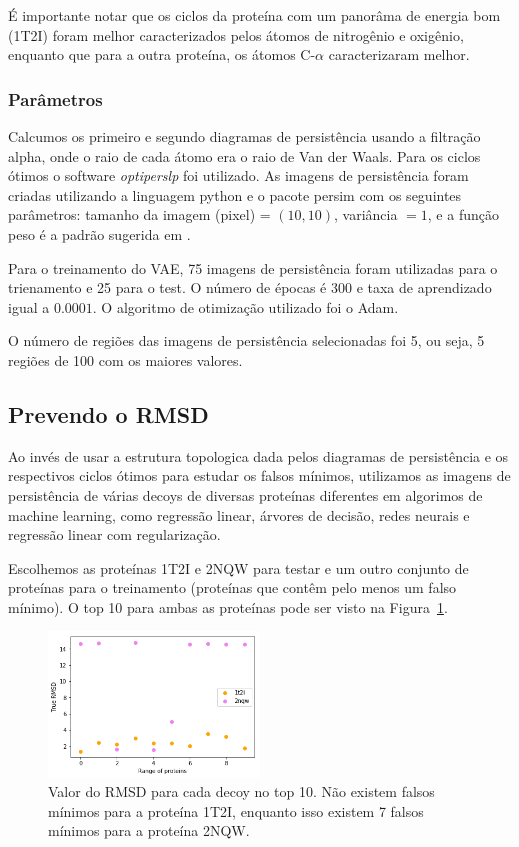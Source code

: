 É importante notar que os ciclos da proteína com um panorâma de energia bom (1T2I) foram melhor caracterizados
pelos átomos de nitrogênio e oxigênio, enquanto que para a outra proteína, os átomos C-$\alpha$ caracterizaram melhor.

\subsubsection{Parâmetros}

Calcumos os primeiro e segundo diagramas de persistência usando a filtração alpha, onde o raio de cada átomo
era o raio de Van der Waals. Para os ciclos ótimos o software \textit{optiperslp} foi utilizado. As imagens
de persistência foram criadas utilizando a linguagem python e o pacote persim \cite{scikittda2019} com
os seguintes parâmetros: tamanho da imagem (pixel) = $(10,10)$, variância $=1$, e a função peso é a padrão
sugerida em \cite{Adams2017}.

Para o treinamento do VAE, 75 imagens de persistência foram utilizadas para o trienamento e 25 para o test. O
número de épocas é 300 e taxa de aprendizado igual a $0.0001$. O algoritmo de otimização utilizado foi o Adam.

O número de regiões das imagens de persistência selecionadas foi 5, ou seja, 5 regiões de 100 com
os maiores valores.

\subsection{Prevendo o RMSD}

Ao invés de usar a estrutura topologica dada pelos diagramas de persistência e os respectivos ciclos ótimos para
estudar os falsos mínimos, utilizamos as imagens de persistência de várias decoys de diversas proteínas diferentes
em algorimos de machine learning, como regressão linear, árvores de decisão, redes neurais e regressão linear
com regularização.

Escolhemos as proteínas 1T2I e 2NQW para testar e um outro conjunto de proteínas para o treinamento (proteínas
que contêm pelo menos um falso mínimo). O top 10 para ambas as proteínas pode ser visto na Figura~\ref{fig:truermsd}.

\begin{figure}[!htbp]
    \centering
    \includegraphics[width=0.5\textwidth]{images/relatorio/true_rmsd.png}
    \caption{Valor do RMSD para cada decoy no top 10. Não existem falsos mínimos para a proteína 1T2I, enquanto
    isso existem 7 falsos mínimos para a proteína 2NQW.}
    \label{fig:truermsd}
    \fautor
\end{figure}

